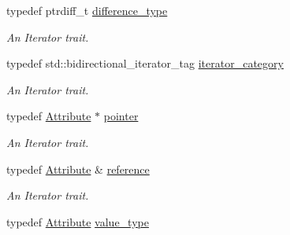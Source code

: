 \begin{DoxyCompactItemize}
\item 
\hypertarget{classMezzanine_1_1xml_1_1AttributeIterator_a0c15a8aa8aa6c4804df0e2f67724ad11}{
typedef ptrdiff\_\-t \hyperlink{classMezzanine_1_1xml_1_1AttributeIterator_a0c15a8aa8aa6c4804df0e2f67724ad11}{difference\_\-type}}
\label{classMezzanine_1_1xml_1_1AttributeIterator_a0c15a8aa8aa6c4804df0e2f67724ad11}

\begin{DoxyCompactList}\small\item\em An Iterator trait. \item\end{DoxyCompactList}\item 
\hypertarget{classMezzanine_1_1xml_1_1AttributeIterator_a7b8b3d2154ff469aaf016eda9add7c6c}{
typedef std::bidirectional\_\-iterator\_\-tag \hyperlink{classMezzanine_1_1xml_1_1AttributeIterator_a7b8b3d2154ff469aaf016eda9add7c6c}{iterator\_\-category}}
\label{classMezzanine_1_1xml_1_1AttributeIterator_a7b8b3d2154ff469aaf016eda9add7c6c}

\begin{DoxyCompactList}\small\item\em An Iterator trait. \item\end{DoxyCompactList}\item 
\hypertarget{classMezzanine_1_1xml_1_1AttributeIterator_abd2829b940f1bdab410027b564a81569}{
typedef \hyperlink{classMezzanine_1_1xml_1_1Attribute}{Attribute} $\ast$ \hyperlink{classMezzanine_1_1xml_1_1AttributeIterator_abd2829b940f1bdab410027b564a81569}{pointer}}
\label{classMezzanine_1_1xml_1_1AttributeIterator_abd2829b940f1bdab410027b564a81569}

\begin{DoxyCompactList}\small\item\em An Iterator trait. \item\end{DoxyCompactList}\item 
\hypertarget{classMezzanine_1_1xml_1_1AttributeIterator_a74e8e7bda17a7a83d2cff4f2509869f9}{
typedef \hyperlink{classMezzanine_1_1xml_1_1Attribute}{Attribute} \& \hyperlink{classMezzanine_1_1xml_1_1AttributeIterator_a74e8e7bda17a7a83d2cff4f2509869f9}{reference}}
\label{classMezzanine_1_1xml_1_1AttributeIterator_a74e8e7bda17a7a83d2cff4f2509869f9}

\begin{DoxyCompactList}\small\item\em An Iterator trait. \item\end{DoxyCompactList}\item 
\hypertarget{classMezzanine_1_1xml_1_1AttributeIterator_a5af0c95a23b768cb094c0b326cd7f400}{
typedef \hyperlink{classMezzanine_1_1xml_1_1Attribute}{Attribute} \hyperlink{classMezzanine_1_1xml_1_1AttributeIterator_a5af0c95a23b768cb094c0b326cd7f400}{value\_\-type}}
\label{classMezzanine_1_1xml_1_1AttributeIterator_a5af0c95a23b768cb094c0b326cd7f400}


\end{DoxyCompactItemize}
